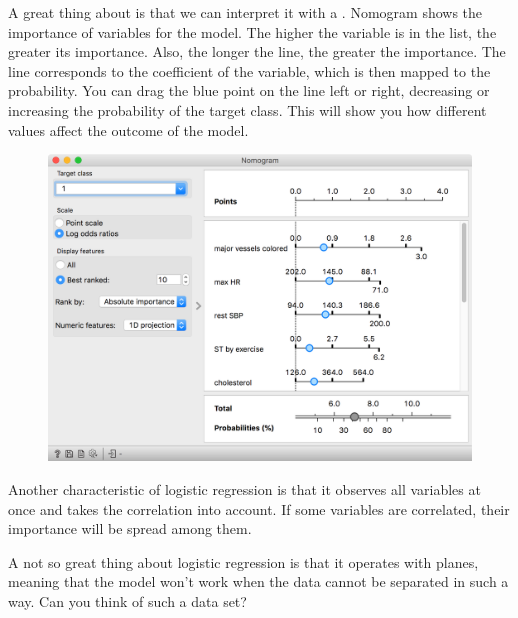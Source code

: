 A great thing about  is that we can interpret it with a . Nomogram shows the importance of variables for the model. The higher the variable is in the list, the greater its importance. Also, the longer the line, the greater the importance. The line corresponds to the coefficient of the variable, which is then mapped to the probability. You can drag the blue point on the line left or right, decreasing or increasing the probability of the target class. This will show you how different values affect the outcome of the model.

\begin{figure}[h]
    \centering
    \vspace{-0.2cm}
    \includegraphics[scale=0.4]{nomogram.png}
\end{figure}

Another characteristic of logistic regression is that it observes all variables at once and takes the correlation into account. If some variables are correlated, their importance will be spread among them.

A not so great thing about logistic regression is that it operates with planes, meaning that the model won't work when the data cannot be separated in such a way. Can you think of such a data set?

